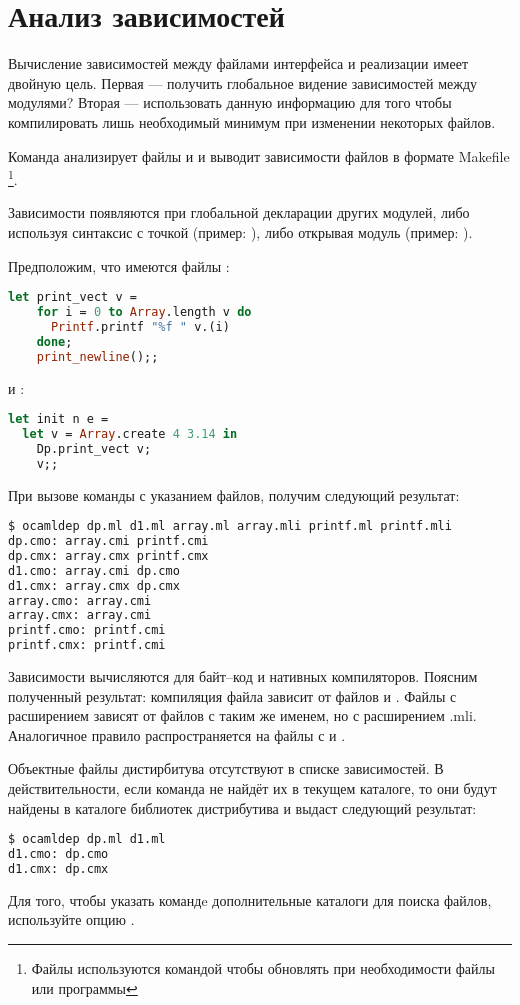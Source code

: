 \section {Анализ зависимостей}
\label{sec:dependency_analysis}

Вычисление зависимостей между файлами интерфейса и реализации имеет двойную 
цель. Первая --- получить глобальное видение зависимостей между модулями? 
Вторая --- использовать данную информацию для того чтобы компилировать лишь 
необходимый минимум при изменении некоторых файлов. 

Команда  анализирует файлы  и  и выводит 
зависимости файлов в формате Makefile \footnote{Файлы  
используются командой  чтобы обновлять при необходимости файлы или 
программы}.

Зависимости появляются при глобальной декларации других модулей, либо используя 
синтаксис с точкой (пример: ), либо открывая модуль (пример: 
).

Предположим, что имеются файлы :

\begin{lstlisting}[language=OCaml]
let print_vect v = 
    for i = 0 to Array.length v do 
      Printf.printf "%f " v.(i)
    done;
    print_newline();;
\end{lstlisting}

и :

\begin{lstlisting}[language=OCaml]
let init n e = 
  let v = Array.create 4 3.14 in 
    Dp.print_vect v;
    v;;
\end{lstlisting}

При вызове команды  с указанием файлов, получим следующий 
результат:

\begin{lstlisting}[language=Bash]
$ ocamldep dp.ml d1.ml array.ml array.mli printf.ml printf.mli
dp.cmo: array.cmi printf.cmi 
dp.cmx: array.cmx printf.cmx 
d1.cmo: array.cmi dp.cmo 
d1.cmx: array.cmx dp.cmx 
array.cmo: array.cmi 
array.cmx: array.cmi 
printf.cmo: printf.cmi 
printf.cmx: printf.cmi 
\end{lstlisting}

Зависимости вычисляются для байт--код и нативных компиляторов. Поясним 
полученный результат: компиляция файла  зависит от файлов 
 и . Файлы с расширением  зависят 
от файлов с таким же именем, но с расширением .mli. Аналогичное правило 
распространяется на файлы  с  и .

Объектные файлы дистирбитува отсутствуют в списке зависимостей. В 
действительности, если команда  не найдёт их в текущем каталоге, 
то они будут найдены в каталоге библиотек дистрибутива и выдаст следующий 
результат:

\begin{lstlisting}[language=Bash]
$ ocamldep dp.ml d1.ml
d1.cmo: dp.cmo 
d1.cmx: dp.cmx 
\end{lstlisting}

Для того, чтобы указать командe  дополнительные каталоги для 
поиска файлов, используйте опцию .
